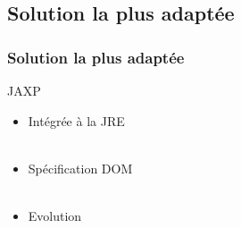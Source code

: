 \subsection{Solution la plus adaptée}
\begin{frame}\frametitle{Solution la plus adaptée}
\begin{beamerboxesrounded}[shadow=true]{JAXP}
\begin{itemize}
	\item Intégrée à la JRE\\
	~\\
	\item Spécification DOM\\
	~\\
	\item Evolution
\end{itemize}
\end{beamerboxesrounded}
\end{frame}
